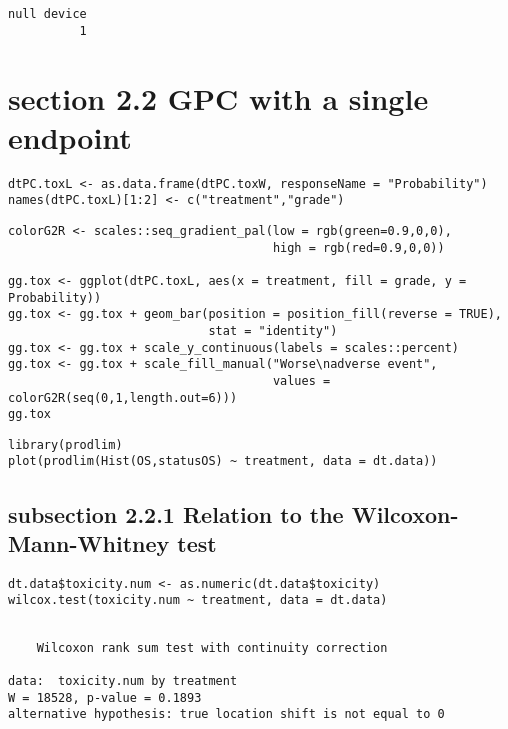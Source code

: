 \documentclass[12pt]{article}
\begin{document}
\begin{verbatim}
null device 
          1
\end{verbatim}
\section{section 2.2 GPC with a single endpoint}
\label{sec:org1aeee16}

\lstset{language=r,label= ,caption= ,captionpos=b,numbers=none}
\begin{lstlisting}
dtPC.toxL <- as.data.frame(dtPC.toxW, responseName = "Probability")
names(dtPC.toxL)[1:2] <- c("treatment","grade")
\end{lstlisting}

\lstset{language=r,label= ,caption= ,captionpos=b,numbers=none}
\begin{lstlisting}
colorG2R <- scales::seq_gradient_pal(low = rgb(green=0.9,0,0),
                                     high = rgb(red=0.9,0,0))

gg.tox <- ggplot(dtPC.toxL, aes(x = treatment, fill = grade, y = Probability))
gg.tox <- gg.tox + geom_bar(position = position_fill(reverse = TRUE),
                            stat = "identity")
gg.tox <- gg.tox + scale_y_continuous(labels = scales::percent)
gg.tox <- gg.tox + scale_fill_manual("Worse\nadverse event",
                                     values = colorG2R(seq(0,1,length.out=6)))
gg.tox 
\end{lstlisting}

\lstset{language=r,label= ,caption= ,captionpos=b,numbers=none}
\begin{lstlisting}
library(prodlim)
plot(prodlim(Hist(OS,statusOS) ~ treatment, data = dt.data))
\end{lstlisting}

\subsection{subsection 2.2.1 Relation to the Wilcoxon-Mann-Whitney test}
\label{sec:orgdfe5895}

\lstset{language=r,label= ,caption= ,captionpos=b,numbers=none}
\begin{lstlisting}
dt.data$toxicity.num <- as.numeric(dt.data$toxicity)
wilcox.test(toxicity.num ~ treatment, data = dt.data)
\end{lstlisting}

\begin{verbatim}

	Wilcoxon rank sum test with continuity correction

data:  toxicity.num by treatment
W = 18528, p-value = 0.1893
alternative hypothesis: true location shift is not equal to 0
\end{verbatim}
\end{document}

